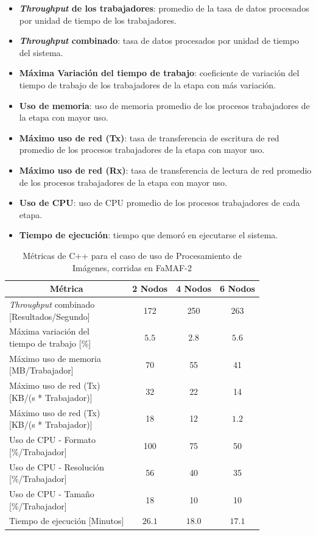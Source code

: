 \documentclass[11pt]{article}
\providecommand{\row}[1]{\parbox{150pt}{\setlength{\baselineskip}{0.2\baselineskip}\strut#1\strut}}
\newcommand{\ipcap}[2]{\caption{Métricas de #1 para el caso de uso de Procesamiento de Imágenes, corridas en #2}}
\newcommand{\english}[1]{\textit{#1}}
\begin{document}
\begin{itemize}
    \item \textbf{\english{Throughput} de los trabajadores}: promedio de la tasa de datos procesados por unidad de tiempo de los trabajadores.
    \item \textbf{\english{Throughput} combinado}: tasa de datos procesados por unidad de tiempo del sistema.
    \item \textbf{Máxima Variación  del tiempo de trabajo}: coeficiente de variación del tiempo de trabajo de los trabajadores de la etapa con más variación.
    \item \textbf{Uso de memoria}: uso de memoria promedio de los procesos trabajadores de la etapa con mayor uso.
    \item \textbf{Máximo uso de red (Tx)}: tasa de transferencia de escritura de red promedio de los procesos trabajadores de la etapa con mayor uso.
    \item \textbf{Máximo uso de red (Rx)}: tasa de transferencia de lectura de red promedio de los procesos trabajadores de la etapa con mayor uso.
    \item \textbf{Uso de CPU}: uso de CPU promedio de los procesos trabajadores de cada etapa.
    \item \textbf{Tiempo de ejecución}: tiempo que demoró en ejecutarse el sistema.
\end{itemize}


\begin{table}[H]
\centering
\begin{tabular}{|l|c|c|c|}
\hline
\multicolumn{1}{|c|}{Métrica} & 2 Nodos & 4 Nodos & 6 Nodos \\ \hline
\row{\english{Throughput} combinado\\{[Resultados/Segundo]}} & 172 & 250 & 263 \\ \hline
\row{Máxima variación del \\ tiempo de trabajo {[}\%{]}} & $5.5$ & $2.8$ & $5.6$ \\ \hline
\row{Máximo uso de memoria \\ {[MB/Trabajador]}} & 70 & 55 & 41 \\ \hline
\row{Máximo uso de red (Tx) \\ {[KB/(s * Trabajador)]}} & 32 & 22 & 14 \\ \hline
\row{Máximo uso de red (Tx) \\ {[KB/(s * Trabajador)]}} & 18 & 12 & $1.2$  \\ \hline
\row{Uso de CPU - Formato\\{[\%/Trabajador]}} & 100 & 75  & 50 \\ \hline
\row{Uso de CPU - Resolución\\{[\%/Trabajador]}} & 56 & 40 & 35 \\ \hline
\row{Uso de CPU - Tamaño\\{[\%/Trabajador]}} & 18 & 10 & 10 \\ \hline
Tiempo de ejecución [Minutos] & $26.1$ & $18.0$ & $17.1$ \\ \hline
\end{tabular}
\ipcap{C++}{FaMAF-2}
\end{table}
\end{document}
